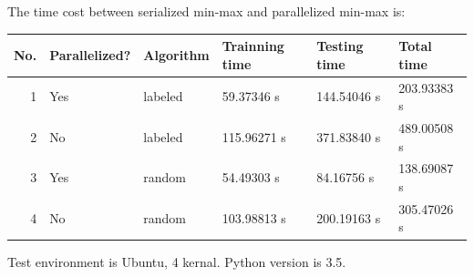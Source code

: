 \documentclass[11pt]{article}
\begin{document}
The time cost between serialized min-max and parallelized min-max is:

\begin{center}
\begin{tabular}{rlllll}
\hline
No. & Parallelized? & Algorithm & Trainning time & Testing time & Total time\\
\hline
1 & Yes & labeled & 59.37346 s & 144.54046 s & 203.93383 s\\
2 & No & labeled & 115.96271 s & 371.83840 s & 489.00508 s\\
3 & Yes & random & 54.49303 s & 84.16756 s & 138.69087 s\\
4 & No & random & 103.98813 s & 200.19163 s & 305.47026 s\\
\hline
\end{tabular}
\end{center}


Test environment is Ubuntu, 4 kernal.
Python version is 3.5.
\end{document}
